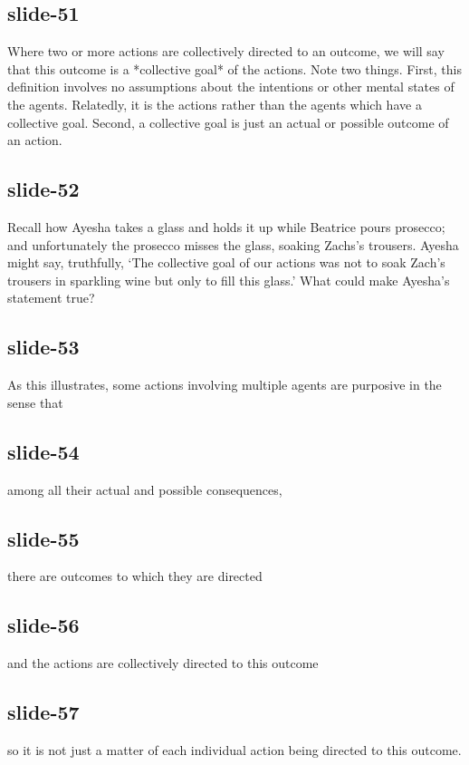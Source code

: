 \documentclass[12pt,\papersize]{extarticle}
\begin{document}
\subsection{slide-51}
Where two or more actions are collectively directed to an outcome, we will say that this
outcome is a *collective goal* of the actions.
Note two things.
First, this definition involves no assumptions about the intentions or other mental states
of the agents.  Relatedly, it is the actions rather than the agents which have a collective goal.
Second, a collective goal is just an actual or possible outcome of an action.

\subsection{slide-52}
Recall how Ayesha takes a glass and holds it up while Beatrice pours prosecco;
and unfortunately the prosecco misses the glass, soaking Zachs’s trousers.
Ayesha might say, truthfully, ‘The collective goal of our actions was not to soak Zach's trousers in
sparkling wine but only to fill this glass.’
What could make Ayesha’s statement true?

\subsection{slide-53}
As this illustrates,
some actions involving multiple agents are purposive in the sense that

\subsection{slide-54}
among all their actual and possible consequences,

\subsection{slide-55}
there are outcomes to which they are directed

\subsection{slide-56}
and the actions are collectively directed to this outcome

\subsection{slide-57}
so it is not just a matter of each individual action being directed to this outcome.
\end{document}
